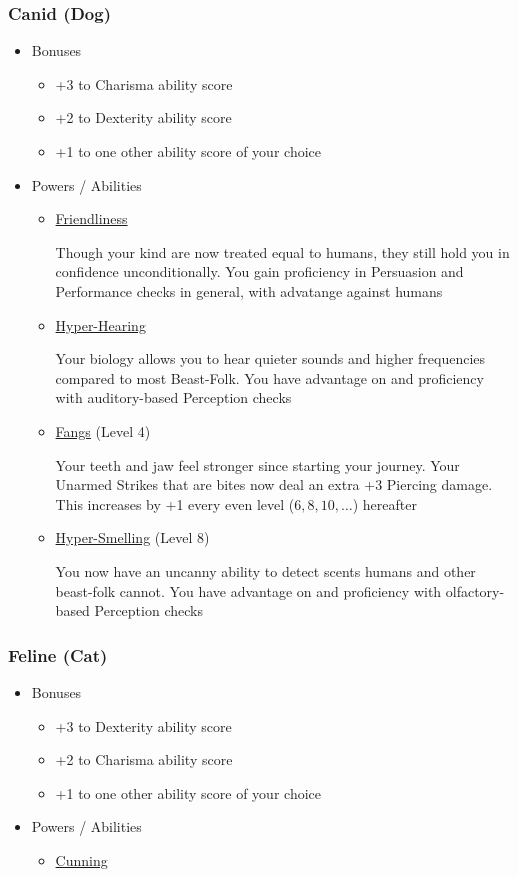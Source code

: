 \documentclass[12pt, landscape]{article}
\begin{document}
\begin{FlushLeft}
\begin{multicols}{2}
			\subsubsection{Canid (Dog)}
			\begin{itemize}
				\item Bonuses
				\begin{itemize}
					\item +3 to Charisma ability score
					\item +2 to Dexterity ability score
					\item +1 to one other ability score of your choice
				\end{itemize}
				\item Powers / Abilities
				\begin{itemize}
					\item \underline{Friendliness}

						Though your kind are now treated equal to humans, they still hold you in confidence unconditionally.
						You gain proficiency in Persuasion and Performance checks in general, with advatange against humans
					\item \underline{Hyper-Hearing}

					Your biology allows you to hear quieter sounds and higher frequencies compared to most Beast-Folk.
					You have advantage on and proficiency with auditory-based Perception checks
					\item \underline{Fangs} (Level 4)

					Your teeth and jaw feel stronger since starting your journey.
					Your Unarmed Strikes that are bites now deal an extra +3 Piercing damage. This increases by +1 every even level ($6, 8, 10, \dots$) hereafter
					\item \underline{Hyper-Smelling} (Level 8)

					You now have an uncanny ability to detect scents humans and other beast-folk cannot.
					You have advantage on and proficiency with olfactory-based Perception checks
				\end{itemize}
			\end{itemize}
			\vfill \null \columnbreak

			\subsubsection{Feline (Cat)}
			\begin{itemize}
				\item Bonuses
				\begin{itemize}
					\item +3 to Dexterity ability score
					\item +2 to Charisma ability score
					\item +1 to one other ability score of your choice
				\end{itemize}
				\item Powers / Abilities
				\begin{itemize}
					\item \underline{Cunning}


\end{itemize}
\end{itemize}
\end{multicols}
\end{FlushLeft}
\end{document}
